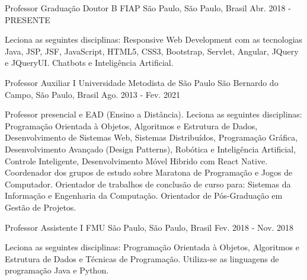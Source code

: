 

\begin{cventries}

  \cventry
    {Professor Graduação Doutor B} %
    {FIAP} %
    {São Paulo, São Paulo, Brasil} %
    {Abr. 2018 - PRESENTE} %
    {
      \begin{cvitems} %
        \item {Leciona as seguintes disciplinas: Responsive Web Development com as tecnologias Java, JSP, JSF, JavaScript, HTML5, CSS3, Bootstrap, Servlet, Angular, JQuery e JQueryUI. Chatbots e Inteligência Artificial.}
      \end{cvitems}
    }

  \cventry
    {Professor Auxiliar I} %
    {Universidade Metodista de São Paulo} %
    {São Bernardo do Campo, São Paulo, Brasil} %
    {Ago. 2013 - Fev. 2021} %
    {
      \begin{cvitems} %
        \item {Professor presencial e EAD (Ensino a Distância). Leciona as seguintes disciplinas: Programação Orientada à Objetos, Algoritmos e Estrutura de Dados, Desenvolvimento de Sistemas Web, Sistemas Distribuídos, Programação Gráfica, Desenvolvimento Avançado (Design Patterns), Robótica e Inteligência Artificial, Controle Inteligente, Desenvolvimento Móvel Hibrido com React Native. Coordenador dos grupos de estudo sobre Maratona de Programação e Jogos de Computador. Orientador de trabalhos de conclusão de curso para: Sistemas da Informação e Engenharia da Computação. Orientador de Pós-Graduação em Gestão de Projetos.}
      \end{cvitems}
    }

  \cventry
    {Professor Assistente I} %
    {FMU} %
    {São Paulo, São Paulo, Brasil} %
    {Fev. 2018 - Nov. 2018} %
    {
      \begin{cvitems} %
        \item {Leciona as seguintes disciplinas: Programação Orientada à Objetos, Algoritmos e Estrutura de Dados e Técnicas de Programação. Utiliza-se as linguagens de programação Java e Python.}
      \end{cvitems}
    }


\end{cventries}
